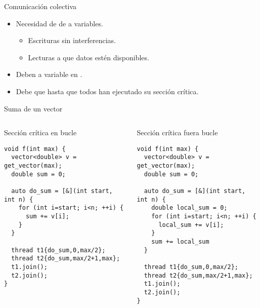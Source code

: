 \begin{frame}[t]{Comunicación colectiva}
\begin{itemize}
  \item Necesidad de  de  a variables.
    \begin{itemize}
      \item Escrituras sin interferencias.
      \item Lecturas  a que datos estén disponibles.
    \end{itemize}

  \item Deben  a variable en .

  \item Debe  que  
        hasta que todos han ejecutado su sección crítica.
  
\end{itemize}
\end{frame}

\begin{frame}[fragile]{Suma de un vector}
\begin{columns}

\begin{block}{Sección crítica en bucle}
\begin{lstlisting}
void f(int max) {
  vector<double> v = get_vector(max);
  double sum = 0;
  
  auto do_sum = [&](int start, int n) {
    for (int i=start; i<n; ++i) {
      sum += v[i];
    }
  }

  thread t1{do_sum,0,max/2};
  thread t2{do_sum,max/2+1,max};
  t1.join();
  t2.join();
}
\end{lstlisting}
\end{block}


\begin{block}{Sección crítica fuera bucle}
\begin{lstlisting}
void f(int max) {
  vector<double> v = get_vector(max);
  double sum = 0;
  
  auto do_sum = [&](int start, int n) {
    double local_sum = 0;
    for (int i=start; i<n; ++i) {
      local_sum += v[i];
    }
    sum += local_sum
  }

  thread t1{do_sum,0,max/2};
  thread t2{do_sum,max/2+1,max};
  t1.join();
  t2.join();
}
\end{lstlisting}
\end{block}

\end{columns}
\end{frame}

